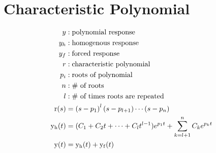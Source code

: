 \section*{Characteristic Polynomial}
\begin{align*}
    y &: \text{polynomial response} \\
    y_h &: \text{homogenous response} \\
    y_f &: \text{forced response} \\
    r &: \text{characteristic polynomial} \\
    p_i &: \text{roots of polynomial} \\
    n &: \text{\# of roots} \\
    l &: \text{\# of times roots are repeated} \\
    \func{r}[s] &= {\left(s-p_1\right)}^l\left(s-p_{l+1}\right)\cdots\left(s-p_n\right) \\
    \func{y_h}[t] &= (C_1 + C_2 t + \cdots + C_l t^{l-1}) e^{p_1 t} + \sum_{k = l+1}^{n} C_k e^{p_k t} \\
    \func{y}[t] &= \func{y_h}[t] + \func{y_f}[t]
\end{align*}